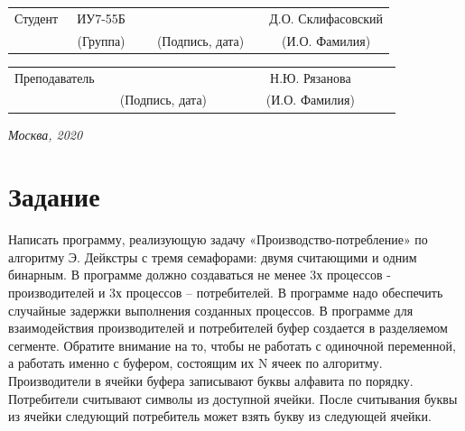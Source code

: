 \documentclass[14pt, a4paper]{extarticle}
\begin{document}
\noindent
{}
\\

\noindent
{}
\\

\vspace{1.5cm}
\noindent
\begin{tabular}{l c c c c c}
	Студент      & ~ИУ7-55Б~               & \hspace{2.5cm} & \hspace{2cm}                 & &  Д.О. Склифасовский \\\cline{2-2}\cline{4-4} \cline{6-6} 
	\hspace{3cm} & {\footnotesize(Группа)} &                & {\footnotesize(Подпись, дата)} & & {\footnotesize(И.О. Фамилия)}
\end{tabular}

\noindent
\begin{tabular}{l c c c c}
	Преподаватель & \hspace{5cm}   & \hspace{2cm}                 & & ~~~~~~Н.Ю. Рязанова~~~~~~\\\cline{3-3} \cline{5-5} 
	\hspace{3cm}  &                & {\footnotesize(Подпись, дата)} & & {\footnotesize(И.О. Фамилия)}
\end{tabular}

\vspace{0.6cm}
\begin{center}	
	\vfill
	\large \textit {Москва, 2020}
\end{center}

\thispagestyle {empty}
\pagebreak

\clearpage
\tableofcontents

\clearpage
\section{Задание}
Написать программу, реализующую задачу «Производство-потребление» по алгоритму Э. Дейкстры с тремя семафорами: двумя считающими и одним бинарным. В программе должно создаваться не менее 3х процессов - производителей и 3х процессов – потребителей. В программе надо обеспечить случайные задержки выполнения созданных процессов. В программе для взаимодействия производителей и потребителей буфер создается в разделяемом сегменте. Обратите внимание на то, чтобы не работать с одиночной переменной, а работать именно с буфером, состоящим их N ячеек по алгоритму. Производители в ячейки буфера записывают буквы алфавита по порядку. Потребители считывают символы из доступной ячейки. После считывания буквы из ячейки следующий потребитель может взять букву из следующей ячейки. \par
\end{document}
